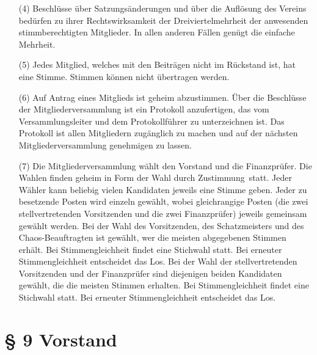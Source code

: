 \documentclass[12pt,paper=a4,ngerman]{scrreprt}
\begin{document}
\begin{itemize}
\item[(4)]
Beschlüsse über Satzungsänderungen und über die Auflösung des Vereins
bedürfen zu ihrer Rechtswirksamkeit der Dreiviertelmehrheit der
anwesenden stimmberechtigten Mitglieder. In allen anderen Fällen
genügt die einfache Mehrheit.
\item[(5)]
Jedes Mitglied, welches mit den Beiträgen nicht im Rückstand ist, hat
eine Stimme. Stimmen können nicht übertragen werden.
\item[(6)]
Auf Antrag eines Mitglieds ist geheim abzustimmen. Über die Beschlüsse
der Mitgliederversammlung ist ein Protokoll anzufertigen, das vom
Versammlungsleiter und dem Protokollführer zu unterzeichnen ist. Das
Protokoll ist allen Mitgliedern zugänglich zu machen und auf der
nächsten Mitgliederversammlung genehmigen zu lassen.
\item[(7)]
Die Mitgliederversammlung wählt den Vorstand und die Finanzprüfer. Die
Wahlen finden geheim in Form der \glqq Wahl durch Zustimmung\grqq\
statt. Jeder Wähler kann beliebig vielen Kandidaten jeweils eine
Stimme geben. Jeder zu besetzende Posten wird einzeln gewählt, wobei
gleichrangige Posten (die zwei stellvertretenden Vorsitzenden und die
zwei Finanzprüfer) jeweils gemeinsam gewählt werden. Bei der Wahl des
Vorsitzenden, des Schatzmeisters und des Chaos-Beauftragten ist
gewählt, wer die meisten abgegebenen Stimmen erhält. Bei
Stimmengleichheit findet eine Stichwahl statt. Bei erneuter
Stimmengleichheit entscheidet das Los. Bei der Wahl der
stellvertretenden Vorsitzenden und der Finanzprüfer sind diejenigen
beiden Kandidaten gewählt, die die meisten Stimmen erhalten. Bei
Stimmengleichheit findet eine Stichwahl statt. Bei erneuter
Stimmengleichheit entscheidet das Los.
\end{itemize}

\section{\S{} 9 Vorstand}
\end{document}
